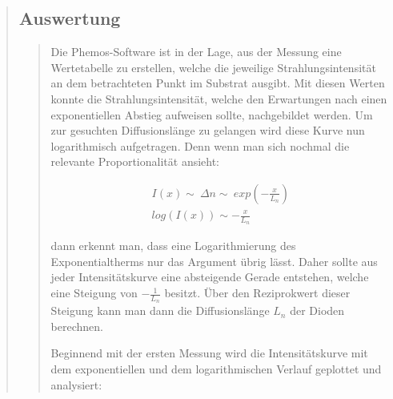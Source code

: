 \begin{quote}
\begin{quote}
        \end{quote}
        
        
        \subsection{Auswertung}
        \begin{quote}
        
        Die Phemos-Software ist in der Lage, aus der Messung eine Wertetabelle
        zu erstellen, welche die jeweilige Strahlungsintensität an dem
        betrachteten Punkt im Substrat ausgibt. Mit diesen Werten konnte die
        Strahlungsintensität, welche den Erwartungen nach einen exponentiellen
        Abstieg aufweisen sollte, nachgebildet werden. Um zur gesuchten
        Diffusionslänge zu gelangen wird diese Kurve nun logarithmisch
        aufgetragen. Denn wenn man sich nochmal die relevante Proportionalität
        ansieht:
        
        \begin{equation*}
        \begin{split}
            I(x) \sim \ \Delta n \sim \ exp(-\frac{x}{L_n})\\
            log(I(x)) \sim -\frac{x}{L_n} 
        \end{split}
        \end{equation*}
        
        dann erkennt man, dass eine Logarithmierung des Exponentialtherms nur
        das Argument übrig lässt. Daher sollte aus jeder Intensitätskurve
        eine absteigende Gerade entstehen, welche eine Steigung von $-\frac{1}{L_n}$
        besitzt. Über den Reziprokwert dieser Steigung kann man dann die
        Diffusionslänge $L_n$ der Dioden berechnen.
        
        \vspace{1em}
        
        Beginnend mit der ersten Messung wird die Intensitätskurve mit dem
        exponentiellen und dem logarithmischen Verlauf geplottet und analysiert:
        

\end{quote}
\end{quote}
